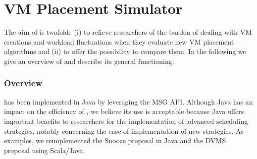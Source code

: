 \vspace*{-.2cm}
\section{VM Placement Simulator}
\label{sec:injector}
\vspace*{-.1cm}

The aim of \vmps is twofold:~(i) to relieve researchers of the burden of
dealing with VM creations and workload fluctuations when they evaluate
new VM placement algorithms and (ii) to offer the possibility to
compare them.
%
In the following we give an overview of \vmps and describe its
general functioning.

\vspace*{-.3cm}
\subsubsection{Overview}
\label{sec:overview}

\vmps has been implemented in Java by leveraging the \sg MSG API.
Although Java has an impact on the efficiency
of \sg, we believe its use is acceptable because Java offers important
benefits to researchers for the implementation of advanced scheduling
strategies, notably concerning the ease of implementation of new
strategies. As examples, we reimplemented the Snooze proposal in Java
and the DVMS proposal using Scala/Java.


